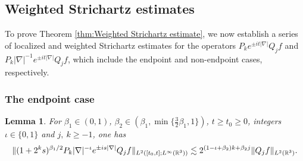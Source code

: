 \documentclass[11pt,twoside]{article}
\def\R{\mathop{\mathbb R\kern 0pt}\nolimits}
\def\f{\frac}
\def\ls{\lesssim}
\theoremstyle{plain}
\newtheorem{lemma}[theorem]{Lemma}
\theoremstyle{definition}
\numberwithin{equation}{section}
\begin{document}
	\subsection{Weighted Strichartz estimates}\label{sec:Weighted Strichartz estimate}

	To prove Theorem \ref{thm:Weighted Strichartz estimate}, we now establish a series of localized and weighted Strichartz estimates
for the operators $P_{k}e^{\pm it|\nabla|}Q_jf$ and $P_{k}|\nabla|^{-1}e^{\pm it|\nabla|}Q_jf$, which include the endpoint
and non-endpoint cases, respectively.

\subsubsection{The endpoint case}

	\begin{lemma}\label{lem:Localized Strichartz estimate}
		For $\beta_1\in(0,1)$, $\beta_2\in(\beta_1,\min\{\f32\beta_1,1\})$, $t\ge t_0\ge 0$,
integers $\iota\in\{0,1\}$ and $j,\ k\ge -1$, one has
		\begin{equation}\label{local:Stric}
			\|(1+2^ks)^{\beta_1/2}P_k|\nabla|^{-\iota} e^{\pm is|\nabla|}Q_jf\|_{L^2([t_0,t];L^\infty(\R^3))}
			\ls2^{(1-\iota+\beta_2) k+\beta_2j}\|Q_jf\|_{L^2(\R^3)}.
		\end{equation}
	\end{lemma}
\end{document}
